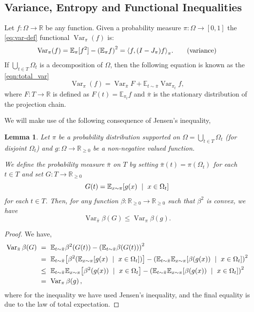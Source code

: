 \documentclass[a4paper, 12p]{article}
\numberwithin{equation}{section}
\newcommand{\Exp}{\mathbb{E}}
\newcommand{\piproj}{\overline{\pi}}
\newcommand{\var}{\operatorname{Var}}
\newcommand{\Om}{\Omega}
\def\RRp{\mathbb{R}_{\ge 0}}
\newtheorem{lemma}[theorem]{Lemma}
\DeclarePairedDelimiter\parens{\lparen}{\rparen}
\DeclarePairedDelimiter\sqbr{[ }{]}
\DeclarePairedDelimiter\inpr{\langle}{\rangle}
\begin{document}
\subsection{Variance, Entropy and Functional Inequalities}
\label{sec:funcineq}
Let $f:\Om\to\mathbb{R}$ be any function. Given a probability measure $\pi:\Omega \to [0,1]$ the
\ref{eq:var-def} functional $\var_\pi(f)$  is:
\begin{equation} \var_\pi(f) = \Exp_\pi[f^2] - \parens*{ \Exp_{\pi}
	f}^2 = \inpr*{ f, (I - J_\pi)
f}_\pi.\tag{variance}\label{eq:var-def}
\end{equation}
If $\bigcup_{t\in T}\Om_t$ is a decomposition of $\Om$, then the following equation is known as the \ref{eqn:total_var}
\begin{equation}\label{eqn:total_var}
    \var_{\pi}(f) = \var_{\piproj} F + \Exp_{t \sim \piproj} \var_{\pi_t} f,
    \tag{law of total variance}
\end{equation}
where $F:T\to\mathbb{R}$ is defined as $F(t)=\Exp_{\pi_t}f$ and $\piproj$ is the stationary distribution of the projection chain.

We will make use of the following consequence of Jensen's inequality,
\begin{lemma}\label{lem:convexity_dpi}
    Let $\pi$ be a probability distribution supported on $\Omega = \bigcup_{t \in T} \Omega_t$ (for disjoint $\Omega_t$) and $g : \Omega \to \RRp$ be a non-negative valued function.

    We define the probability measure $\bar\pi$ on $T$ by setting $\bar\pi(t) = \pi(\Omega_t)$ for each $t \in T$ and set $G : T \to \RRp$ 
    \[ G(t) = \Exp_{x \sim \pi}\sqbr*{g(x)~\mid~x \in \Omega_t}\]
    for each $t \in T$.
    Then, for any function $\beta: \RRp \to \RRp$ such that $\beta^2$ is convex, we have
    \[ \var_{\bar \pi} \beta(G) \le \var_\pi \beta(g).\]
\end{lemma}
\begin{proof}
    We have,
    \begin{align*}
        \var_{\bar\pi} \beta(G)
        &~=~\Exp_{t \sim \bar\pi} \beta^2(G(t)) - \parens*{\Exp_{t \sim \bar\pi} \beta(G(t))}^2\\
        &~=~\Exp_{t \sim \bar\pi} \sqbr*{\beta^2\parens*{\Exp_{x \sim \pi}\sqbr*{ g(x)~\mid~x \in \Omega_t}}} - \parens*{\Exp_{t \sim \bar \pi} \Exp_{x \sim \pi}\sqbr*{ \beta(g(x))~\mid~x \in \Omega_t} }^2\\
        &~\le~\Exp_{t \sim \bar\pi} \Exp_{x \sim \pi}\sqbr*{ \beta^2(g(x))~\mid~x \in \Omega_t} -  \parens*{\Exp_{t \sim \bar \pi} \Exp_{x \sim \pi}\sqbr*{ \beta(g(x))~\mid~x \in \Omega_t} }^2\\
        &~=~\var_{\pi} \beta(g)\,,
    \end{align*}
    where for the inequality we have used Jensen's inequality, and the final equality is due to the law of total expectation.
\end{proof}
\end{document}
